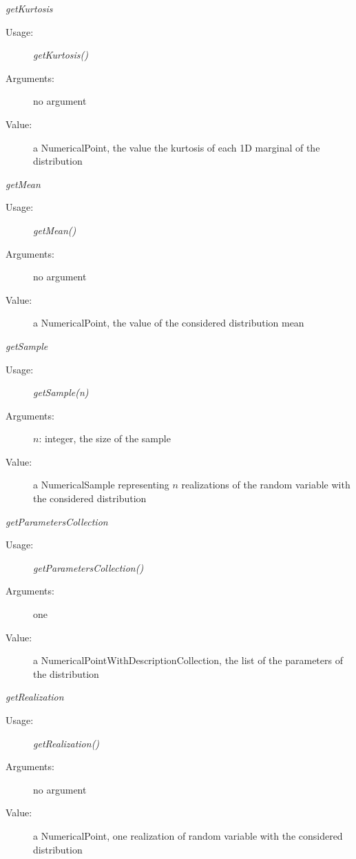 \begin{description}
\begin{description}
\item \textit{getKurtosis}
\begin{description}
\item[Usage:] \textit{getKurtosis()}
\item[Arguments:] no argument
\item[Value:] a NumericalPoint, the value the kurtosis of each 1D marginal of the distribution
\end{description}
\bigskip

\item \textit{getMean}
\begin{description}
\item[Usage:] \textit{getMean()}
\item[Arguments:] no argument
\item[Value:] a NumericalPoint, the value of the considered distribution mean
\end{description}
\bigskip

\item \textit{getSample}
\begin{description}
\item[Usage:] \textit{getSample(n)}
\item[Arguments:] $n$: integer, the size of the sample
\item[Value:] a NumericalSample representing $n$ realizations of the random variable with the considered distribution
\end{description}
\bigskip

\item \textit{getParametersCollection}
\begin{description}
\item[Usage:] \textit{getParametersCollection()}
\item[Arguments:] one
\item[Value:] a NumericalPointWithDescriptionCollection, the list of the parameters of the distribution

\end{description}
\bigskip


\item \textit{getRealization}
\begin{description}
\item[Usage:] \textit{getRealization()}
\item[Arguments:] no argument
\item[Value:] a NumericalPoint, one realization of random variable with the considered distribution
\end{description}
\bigskip


\end{description}
\end{description}
